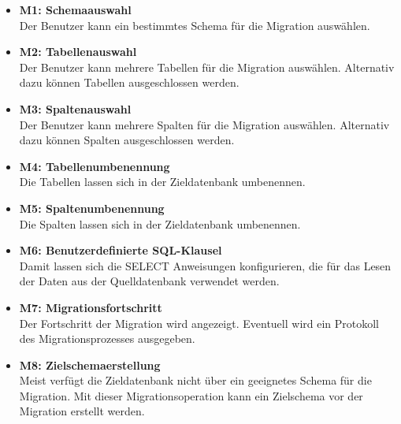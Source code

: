 \begin{itemize}
	\item \textbf{M1: Schemaauswahl} \\
	Der Benutzer kann ein bestimmtes Schema für die Migration auswählen.
	\item \textbf{M2: Tabellenauswahl} \\
	Der Benutzer kann mehrere Tabellen für die Migration auswählen. Alternativ dazu können Tabellen ausgeschlossen werden.
	\item \textbf{M3: Spaltenauswahl} \\
	Der Benutzer kann mehrere Spalten für die Migration auswählen. Alternativ dazu können Spalten ausgeschlossen werden.
	\item \textbf{M4: Tabellenumbenennung} \\
	Die Tabellen lassen sich in der Zieldatenbank umbenennen.
	\item \textbf{M5: Spaltenumbenennung} \\
	Die Spalten lassen sich in der Zieldatenbank umbenennen.
	\item \textbf{M6: Benutzerdefinierte SQL-Klausel} \\
	Damit lassen sich die SELECT Anweisungen konfigurieren, die für das Lesen der Daten aus der Quelldatenbank verwendet werden.
	\item \textbf{M7: Migrationsfortschritt} \\
	Der Fortschritt der Migration wird angezeigt. Eventuell wird ein Protokoll des Migrationsprozesses ausgegeben.
	\item \textbf{M8: Zielschemaerstellung} \\
	Meist verfügt die Zieldatenbank nicht über ein geeignetes Schema für die Migration. Mit dieser Migrationsoperation kann ein Zielschema vor der Migration erstellt werden.
\end{itemize}


	


